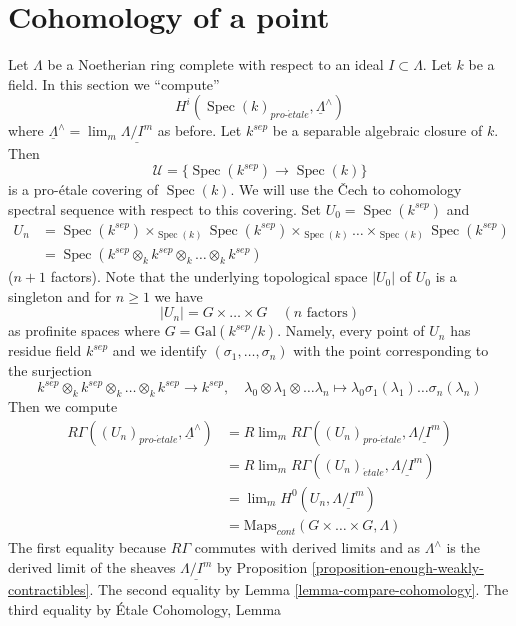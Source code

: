 \documentclass[10pt,a4paper]{article}
\theoremstyle{plain}
\theoremstyle{definition}
\theoremstyle{remark}
\numberwithin{equation}{subsection}
\def\lim{\mathop{\mathrm{lim}}\nolimits}
\def\Spec{\mathop{\mathrm{Spec}}}
\def\proetale{{pro\text{-}\acute{e}tale}}
\def\etale{{\acute{e}tale}}
\begin{document}
\section{Cohomology of a point}
\label{section-cohomology-point}

\noindent
Let $\Lambda$ be a Noetherian ring complete with respect to an ideal
$I \subset \Lambda$. Let $k$ be a field. In this section we ``compute''
$$
H^i(\Spec(k)_\proetale, \underline{\Lambda}^\wedge)
$$
where $\underline{\Lambda}^\wedge = \lim_m \underline{\Lambda/I^m}$ as before.
Let $k^{sep}$ be a separable algebraic closure of $k$.
Then
$$
\mathcal{U} = \{\Spec(k^{sep}) \to \Spec(k)\}
$$
is a pro-\'etale covering of $\Spec(k)$. We will use the {\v C}ech
to cohomology spectral sequence with respect to this covering.
Set $U_0 = \Spec(k^{sep})$ and
\begin{align*}
U_n & =
\Spec(k^{sep}) \times_{\Spec(k)}
\Spec(k^{sep}) \times_{\Spec(k)} \ldots
\times_{\Spec(k)} \Spec(k^{sep}) \\
& =
\Spec(k^{sep} \otimes_k k^{sep} \otimes_k \ldots \otimes_k k^{sep})
\end{align*}
($n + 1$ factors). Note that the underlying topological space
$|U_0|$ of $U_0$ is a singleton and for $n \geq 1$ we have
$$
|U_n| = G \times \ldots \times G\quad (n\text{ factors})
$$
as profinite spaces where $G = \text{Gal}(k^{sep}/k)$. Namely, every
point of $U_n$ has residue field $k^{sep}$ and we identify
$(\sigma_1, \ldots, \sigma_n)$ with the point corresponding to the
surjection
$$
k^{sep} \otimes_k k^{sep} \otimes_k \ldots \otimes_k k^{sep}
\longrightarrow k^{sep}, \quad
\lambda_0 \otimes \lambda_1 \otimes \ldots \lambda_n
\longmapsto \lambda_0 \sigma_1(\lambda_1) \ldots \sigma_n(\lambda_n)
$$
Then we compute
\begin{align*}
R\Gamma((U_n)_\proetale, \underline{\Lambda}^\wedge)
& =
R\lim_m R\Gamma((U_n)_\proetale, \underline{\Lambda/I^m}) \\
& =
R\lim_m R\Gamma((U_n)_\etale, \underline{\Lambda/I^m}) \\
& =
\lim_m H^0(U_n, \underline{\Lambda/I^m}) \\
& = 
\text{Maps}_{cont}(G \times \ldots \times G, \Lambda)
\end{align*}
The first equality because $R\Gamma$ commutes with derived limits
and as $\Lambda^\wedge$ is the derived limit of the sheaves
$\underline{\Lambda/I^m}$ by
Proposition \ref{proposition-enough-weakly-contractibles}.
The second equality by Lemma \ref{lemma-compare-cohomology}.
The third equality by \'Etale Cohomology, Lemma
\end{document}
